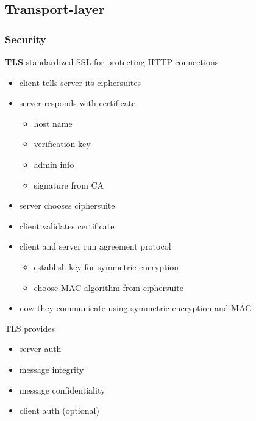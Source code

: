 \documentclass[]{article}
\theoremstyle{definition}
\begin{document}
	\subsection{Transport-layer}
	\subsubsection{Security}
	\textbf{TLS} standardized SSL for protecting HTTP connections
	\begin{itemize}
		\item client tells server its ciphersuites
		\item server responds with certificate
			\begin{itemize}
				\item host name
				\item verification key
				\item admin info
				\item signature from CA
			\end{itemize}
		\item server chooses ciphersuite
		\item client validates certificate
		\item client and server run agreement protocol
			\begin{itemize}
				\item establish key for symmetric encryption
				\item choose MAC algorithm from ciphersuite
			\end{itemize}
		\item now they communicate using symmetric encryption and MAC
	\end{itemize}
	TLS provides
	\begin{itemize}
		\item server auth
		\item message integrity
		\item message confidentiality
		\item client auth (optional)
	\end{itemize}
\end{document}
